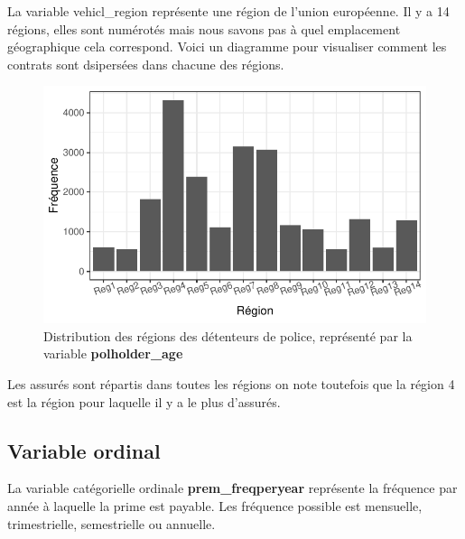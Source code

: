 \documentclass[
]{article}
\begin{document}
La variable vehicl\_region représente une région de l'union européenne.
Il y a 14 régions, elles sont numérotés mais nous savons pas à quel
emplacement géographique cela correspond. Voici un diagramme pour
visualiser comment les contrats sont dsipersées dans chacune des
régions.

\begin{figure}

{\centering \includegraphics{01-01-Pretraitement_files/figure-latex/graph_vehicl_region-1} 

}

\caption{\label{fig:vehiclregion}Distribution des régions des détenteurs de police, représenté par la variable \textbf{polholder\_age}}\label{fig:graph_vehicl_region}
\end{figure}

Les assurés sont répartis dans toutes les régions on note toutefois que
la région 4 est la région pour laquelle il y a le plus d'assurés.

\hypertarget{variable-ordinal}{%
\subsection{Variable ordinal}\label{variable-ordinal}}

La variable catégorielle ordinale \textbf{prem\_freqperyear} représente
la fréquence par année à laquelle la prime est payable. Les fréquence
possible est mensuelle, trimestrielle, semestrielle ou annuelle.
\end{document}
